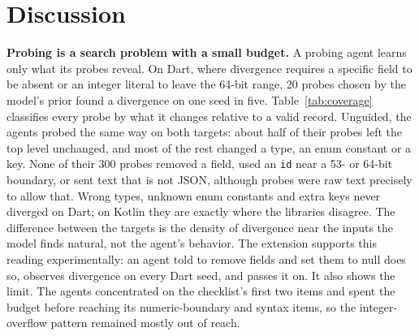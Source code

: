 \section{Discussion}

\textbf{Probing is a search problem with a small budget.} A probing agent
learns only what its probes reveal. On Dart, where divergence requires a
specific field to be absent or an integer literal to leave the 64-bit range,
20 probes chosen by the model's prior found a divergence on one seed in five.
Table~\ref{tab:coverage} classifies every probe by what it changes
relative to a valid record. Unguided, the agents probed the same way on both
targets: about half of their probes left the top level unchanged, and most
of the rest changed a type, an enum constant or a key. None of their 300 probes removed a field, used an
\texttt{id} near a 53- or 64-bit boundary, or sent text that is not JSON,
although probes were raw text precisely to allow that. Wrong types, unknown
enum constants and extra keys never diverged on Dart; on Kotlin they are
exactly where the libraries disagree. The difference between the targets is
the density of divergence near the inputs the model finds natural, not the
agent's behavior. The extension supports this reading experimentally: an
agent told to remove fields and set them to null does so, observes
divergence on every Dart seed, and passes it on. It also shows the limit.
The agents concentrated on the checklist's first two items and spent the
budget before reaching its numeric-boundary and syntax items, so the
integer-overflow pattern remained mostly out of reach.

